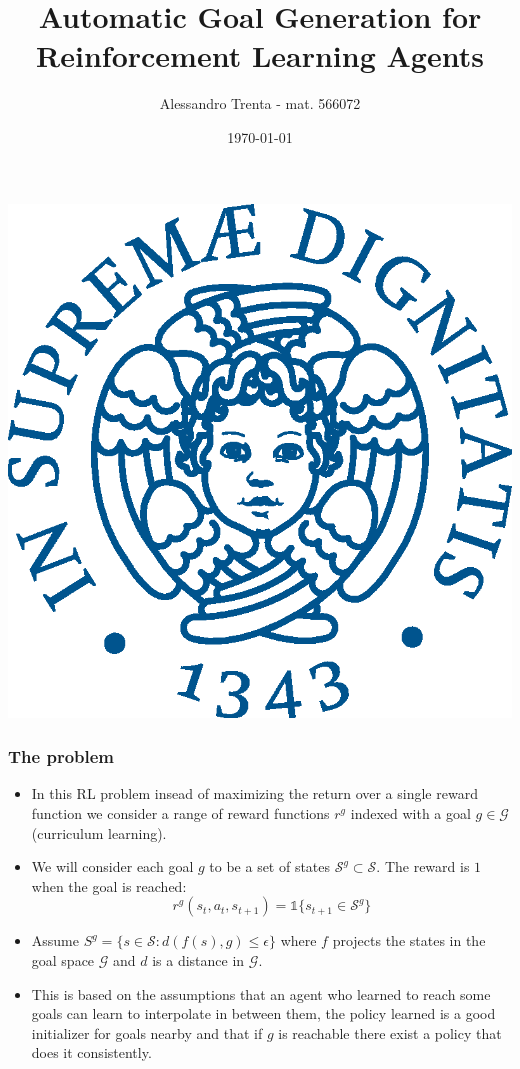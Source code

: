 \documentclass{beamer}
\title[Automatic Goal Generation for RL agents]{Automatic Goal Generation for Reinforcement Learning Agents} %
\author[Alessandro Trenta]{Alessandro Trenta - mat. 566072} %
\institute[UniPi] %
{ISPR - Dep. of Informatics \\ Università di Pisa %
}
\date{\today} %
\theoremstyle{plain}
\theoremstyle{definition}
\theoremstyle{remark}
\begin{document}
\begin{frame}[plain]
\begin{center}
	\includegraphics[width=0.25\linewidth]{Logo/cherubino_pant541}
\end{center}
\titlepage %
\end{frame}

\begin{frame}
	\frametitle{The problem}
	\begin{itemize}
		\item In this RL problem insead of maximizing the return over a single reward function we consider a range of reward functions $r^g$ indexed with a goal $g\in\mathcal{G}$ (curriculum learning).
  		\item We will consider each goal $g$ to be a set of states $\mathcal{S}^{g}\subset \mathcal{S}$. The reward is $1$ when the goal is reached:
			\begin{equation*}
				r^{g}(s_t, a_t, s_{t+1}) = \mathds{1}\{s_{t+1} \in \mathcal{S}^{g}\}
			\end{equation*}
		\item Assume $S^{g} = \{s\in \mathcal{S}: d(f(s), g)\leq \epsilon\}$ where $f$ projects the states in the goal space $\mathcal{G}$ and $d$ is a distance in $\mathcal{G}$.
		\item This is based on the assumptions that an agent who learned to reach some goals can learn to interpolate in between them, the policy learned is a good initializer for goals nearby and that if $g$ is reachable there exist a policy that does it consistently.
	\end{itemize}
\end{frame}
\end{document}
